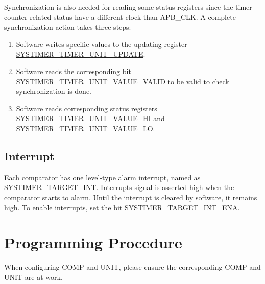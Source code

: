 \documentclass[main\_\_EN.tex]{subfiles}
\begin{document}
Synchronization is also needed for reading some status registers since the timer counter related status have a different clock than APB\_CLK.  A complete synchronization action takes three steps:
\begin{enumerate}
    \item Software writes specific values to the updating register \hyperref[fielddesc:SYSTIMERTIMERUNIT0UPDATE]{SYSTIMER\_TIMER\_UNIT\_UPDATE}.
    \item Software reads the corresponding bit \hyperref[fielddesc:SYSTIMERTIMERUNIT0VALUEVALID]{SYSTIMER\_TIMER\_UNIT\_VALUE\_VALID} to be valid to check synchronization is done.
    \item Software reads corresponding status registers \hyperref[fielddesc:SYSTIMERTIMERUNIT0VALUEHI]{SYSTIMER\_TIMER\_UNIT\_VALUE\_HI} and \hyperref[fielddesc:SYSTIMERTIMERUNIT0VALUELO]{SYSTIMER\_TIMER\_UNIT\_VALUE\_LO}.
\end{enumerate}

\subsection{Interrupt}
Each comparator has one level-type alarm interrupt, named as SYSTIMER\_TARGET\_INT. Interrupts signal is asserted high when the comparator starts to alarm. Until the interrupt is cleared by software, it remains high. To enable interrupts, set the bit \hyperref[fielddesc:SYSTIMERTARGET0INTENA]{SYSTIMER\_TARGET\_INT\_ENA}.



\section{Programming Procedure}\label{sec:instructions-of-usage}
When configuring COMP and UNIT, please ensure the corresponding COMP and UNIT are at work.
\end{document}

